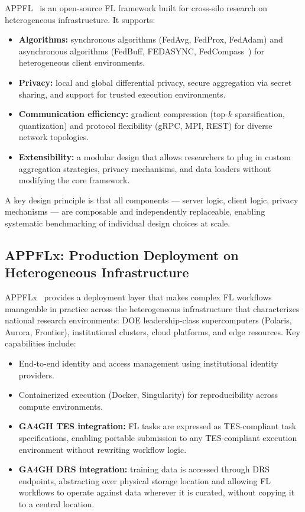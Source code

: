 \documentclass[conference]{IEEEtran}
\begin{document}
APPFL~\cite{ryu2022appfl, li2025advances} is an open-source FL framework built for cross-silo research on heterogeneous infrastructure. It supports:
\begin{itemize}
    \item \textbf{Algorithms:} synchronous algorithms (FedAvg, FedProx, FedAdam) and asynchronous algorithms (FedBuff, FEDASYNC, FedCompass~\cite{li2024fedcompass}) for heterogeneous client environments.
    \item \textbf{Privacy:} local and global differential privacy, secure aggregation via secret sharing, and support for trusted execution environments.
    \item \textbf{Communication efficiency:} gradient compression (top-$k$ sparsification, quantization) and protocol flexibility (gRPC, MPI, REST) for diverse network topologies.
    \item \textbf{Extensibility:} a modular design that allows researchers to plug in custom aggregation strategies, privacy mechanisms, and data loaders without modifying the core framework.
\end{itemize}

A key design principle is that all components — server logic, client logic, privacy mechanisms — are composable and independently replaceable, enabling systematic benchmarking of individual design choices at scale.

\subsection{APPFLx: Production Deployment on Heterogeneous Infrastructure}

APPFLx~\cite{li2023appflx, hoang2025appflx} provides a deployment layer that makes complex FL workflows manageable in practice across the heterogeneous infrastructure that characterizes national research environments: DOE leadership-class supercomputers (Polaris, Aurora, Frontier), institutional clusters, cloud platforms, and edge resources. Key capabilities include:
\begin{itemize}
    \item End-to-end identity and access management using institutional identity providers.
    \item Containerized execution (Docker, Singularity) for reproducibility across compute environments.
    \item \textbf{GA4GH TES integration:} FL tasks are expressed as TES-compliant task specifications, enabling portable submission to any TES-compliant execution environment without rewriting workflow logic.
    \item \textbf{GA4GH DRS integration:} training data is accessed through DRS endpoints, abstracting over physical storage location and allowing FL workflows to operate against data wherever it is curated, without copying it to a central location.
\end{itemize}
\end{document}
